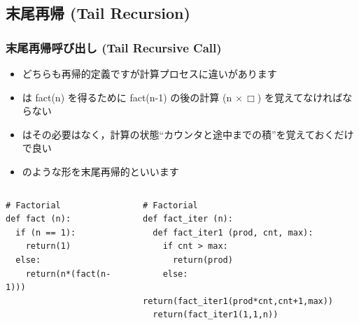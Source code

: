 \subsection{末尾再帰 (Tail Recursion)}
\begin{frame}
\frametitle{末尾再帰呼び出し (Tail Recursive Call)}
  \begin{itemize}
\item どちらも再帰的定義ですが計算プロセスに違いがあります
\item {} は fact(n) を得るために fact(n-1) の後の計算 (n  $\times\,\Box$) を覚えてなければならない
\item {} はその必要はなく，計算の状態``カウンタと途中までの積''を覚えておくだけで良い
\item {} のような形を末尾再帰的といいます
  \end{itemize}
\vspace{-2em}
  \begin{columns}[t]
    \begin{column}{0.45\textwidth}
      \begin{lstlisting}[caption={再帰プロセス版},label=fact-rec1]
# Factorial
def fact (n):
  if (n == 1):
    return(1)
  else:
    return(n*(fact(n-1)))
      \end{lstlisting}
    \end{column}
    \begin{column}{0.5\textwidth}
      \begin{lstlisting}[firstnumber=16,caption={繰り返しプロセス版},label=fact-iter]
# Factorial
def fact_iter (n):
  def fact_iter1 (prod, cnt, max):
    if cnt > max:
      return(prod)
    else:
      return(fact_iter1(prod*cnt,cnt+1,max))
  return(fact_iter1(1,1,n))
      \end{lstlisting}
    \end{column}
  \end{columns}
\end{frame}
